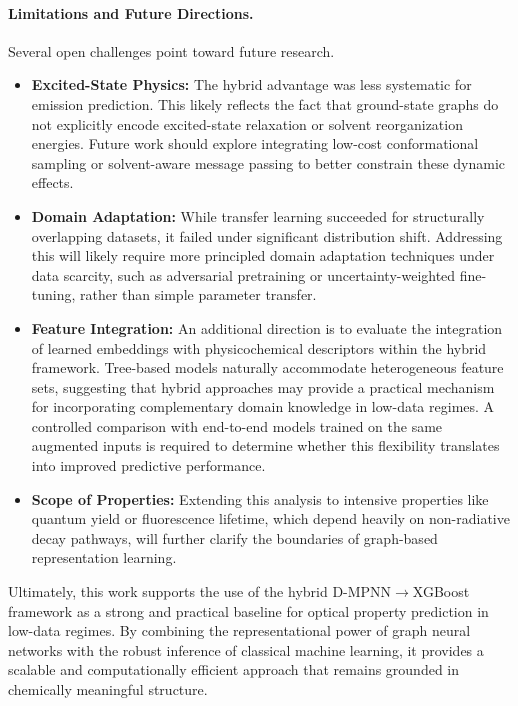 \paragraph{Limitations and Future Directions.}
Several open challenges point toward future research.
\begin{itemize}
    \item \textbf{Excited-State Physics:} The hybrid advantage was less systematic for emission prediction. This likely reflects the fact that ground-state graphs do not explicitly encode excited-state relaxation or solvent reorganization energies. Future work should explore integrating low-cost conformational sampling or solvent-aware message passing to better constrain these dynamic effects.
    \item \textbf{Domain Adaptation:} While transfer learning succeeded for structurally overlapping datasets, it failed under significant distribution shift. Addressing this will likely require more principled domain adaptation techniques under data scarcity, such as adversarial pretraining or uncertainty-weighted fine-tuning, rather than simple parameter transfer.
    \item \textbf{Feature Integration:} An additional direction is to evaluate the integration of learned embeddings with physicochemical descriptors within the hybrid framework. Tree-based models naturally accommodate heterogeneous feature sets, suggesting that hybrid approaches may provide a practical mechanism for incorporating complementary domain knowledge in low-data regimes. A controlled comparison with end-to-end models trained on the same augmented inputs is required to determine whether this flexibility translates into improved predictive performance.
    \item \textbf{Scope of Properties:} Extending this analysis to intensive properties like quantum yield or fluorescence lifetime, which depend heavily on non-radiative decay pathways, will further clarify the boundaries of graph-based representation learning.
\end{itemize}

Ultimately, this work supports the use of the hybrid D-MPNN$\rightarrow$XGBoost framework as a strong and practical baseline for optical property prediction in low-data regimes. By combining the representational power of graph neural networks with the robust inference of classical machine learning, it provides a scalable and computationally efficient approach that remains grounded in chemically meaningful structure.